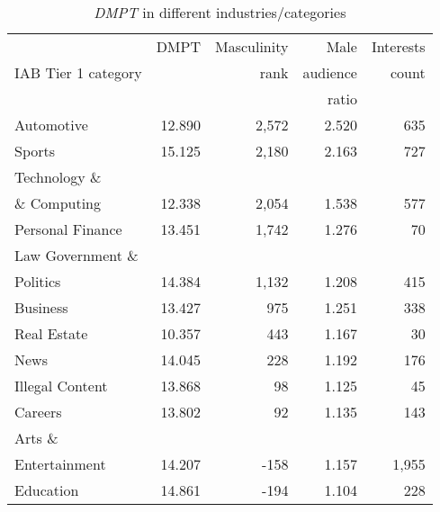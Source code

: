 \documentclass[twocolumn]{bmcart}\usepackage{lineno}
\begin{document}
\begin{center}

    \begin{table}[!t]
        \caption{\emph{DMPT} in different industries/categories
        {\label{tab:CatPink}}}
\color{blue}
        \begin{adjustbox}{width=\columnwidth,center}

\begin{tabular}{|l|rrrr|}
\hline

                            &  DMPT           &Masculinity  & Male & Interests  \\ 
                            IAB Tier 1 category                    &             &rank  & audience &  count \\ 
          &        &  & ratio &  \\ \hline
               Automotive &      12.890 &       2,572 &              2.520 &        635 \\
                   Sports &      15.125 &       2,180 &              2.163 &        727 \\
   Technology \&  &     &       &               &         \\
   \& Computing &     12.338 &       2,054 &              1.538 &        577 \\
         Personal Finance &      13.451 &       1,742 &              1.276 &         70 \\
Law Government \& &      &        &               &         \\
 Politics &     14.384 &       1,132 &              1.208 &        415 \\
                 Business &      13.427 &        975 &               1.251 &        338 \\
              Real Estate &      10.357 &        443 &               1.167 &         30 \\
                     News &      14.045 &        228 &               1.192 &        176 \\
          Illegal Content &      13.868 &         98 &               1.125 &         45 \\
                  Careers &      13.802 &         92 &               1.135 &        143 \\
     Arts \&  &      &       &                &        \\
     Entertainment &     14.207 &       -158 &               1.157 &       1,955 \\
                Education &      14.861 &       -194 &               1.104 &        228 \\

\end{tabular}
\end{adjustbox}
\end{table}
\end{center}
\end{document}
